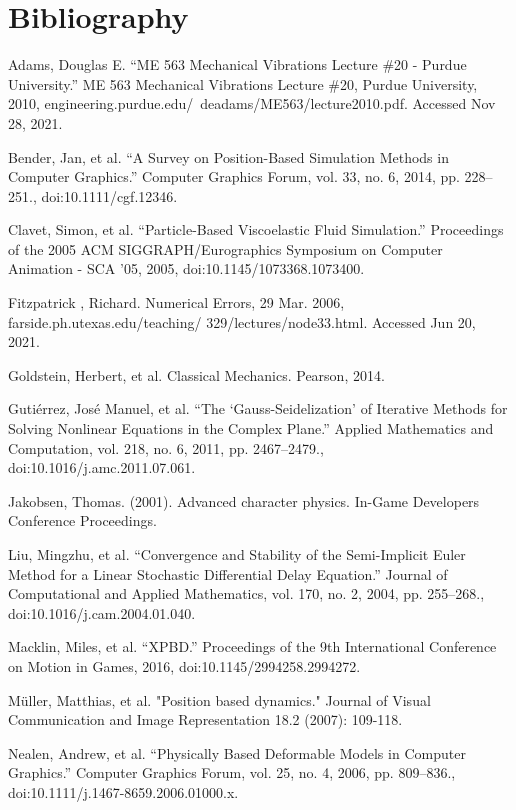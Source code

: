 \documentclass[12pt, letterpaper]{article}
\begin{document}
\section{Bibliography}
\noindent
\vspace{-2em}
\setlength{\parindent}{-0.5in}
\setlength{\leftskip}{0.5in}

Adams, Douglas E. “ME 563 Mechanical Vibrations Lecture \#20 - Purdue University.” ME 563 Mechanical Vibrations Lecture \#20, Purdue University, 2010, engineering.purdue.edu/~deadams/ME563/lecture2010.pdf. Accessed Nov 28, 2021.

Bender, Jan, et al. “A Survey on Position-Based Simulation Methods in Computer Graphics.” Computer Graphics Forum, vol. 33, no. 6, 2014, pp. 228–251., doi:10.1111/cgf.12346.

Clavet, Simon, et al. “Particle-Based Viscoelastic Fluid Simulation.” Proceedings of the 2005 ACM SIGGRAPH/Eurographics Symposium on Computer Animation - SCA '05, 2005, doi:10.1145/1073368.1073400.

Fitzpatrick , Richard. Numerical Errors, 29 Mar. 2006, farside.ph.utexas.edu/teaching/ 329/lectures/node33.html. Accessed Jun 20, 2021.

Goldstein, Herbert, et al. Classical Mechanics. Pearson, 2014. 

Gutiérrez, José Manuel, et al. “The ‘Gauss-Seidelization’ of Iterative Methods for Solving Nonlinear Equations in the Complex Plane.” Applied Mathematics and Computation, vol. 218, no. 6, 2011, pp. 2467–2479., doi:10.1016/j.amc.2011.07.061. 

Jakobsen, Thomas. (2001). Advanced character physics. In-Game Developers Conference Proceedings. 

Liu, Mingzhu, et al. “Convergence and Stability of the Semi-Implicit Euler Method for a Linear Stochastic Differential Delay Equation.” Journal of Computational and Applied Mathematics, vol. 170, no. 2, 2004, pp. 255–268., doi:10.1016/j.cam.2004.01.040. 

Macklin, Miles, et al. “XPBD.” Proceedings of the 9th International Conference on Motion in Games, 2016, doi:10.1145/2994258.2994272. 

Müller, Matthias, et al. "Position based dynamics." Journal of Visual Communication and Image Representation 18.2 (2007): 109-118.

Nealen, Andrew, et al. “Physically Based Deformable Models in Computer Graphics.” Computer Graphics Forum, vol. 25, no. 4, 2006, pp. 809–836., doi:10.1111/j.1467-8659.2006.01000.x.  
\end{document}
